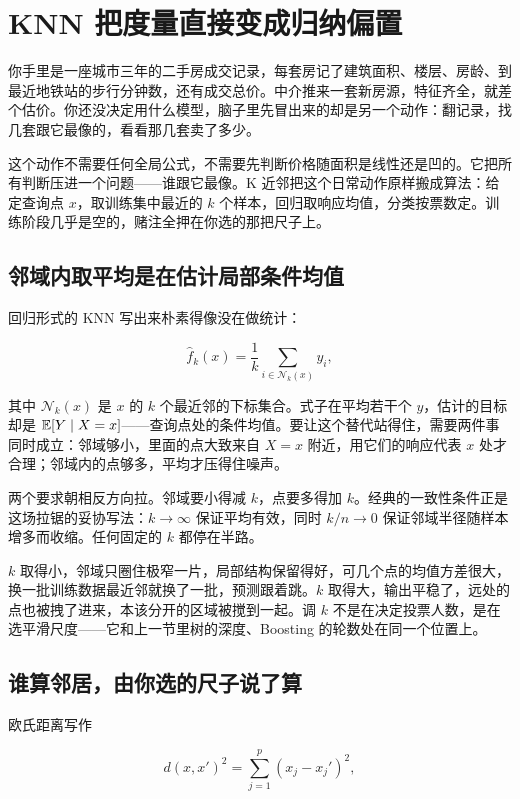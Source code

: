 \section{KNN 把度量直接变成归纳偏置}
\label{sec:13-Machine-Learning/03-Trees-Ensembles-and-Neighbors/03}

你手里是一座城市三年的二手房成交记录，每套房记了建筑面积、楼层、房龄、到最近地铁站的步行分钟数，还有成交总价。中介推来一套新房源，特征齐全，就差个估价。你还没决定用什么模型，脑子里先冒出来的却是另一个动作：翻记录，找几套跟它最像的，看看那几套卖了多少。

这个动作不需要任何全局公式，不需要先判断价格随面积是线性还是凹的。它把所有判断压进一个问题——谁跟它最像。K 近邻把这个日常动作原样搬成算法：给定查询点 \(x\)，取训练集中最近的 \(k\) 个样本，回归取响应均值，分类按票数定。训练阶段几乎是空的，赌注全押在你选的那把尺子上。

\subsection{邻域内取平均是在估计局部条件均值}

回归形式的 KNN 写出来朴素得像没在做统计：

\[
\widehat f_k(x)=\frac1k\sum_{i\in\mathcal N_k(x)}y_i ,
\]

其中 \(\mathcal N_k(x)\) 是 \(x\) 的 \(k\) 个最近邻的下标集合。式子在平均若干个 \(y\)，估计的目标却是 \(\mathbb{E}[Y\mid X=x]\)——查询点处的条件均值。要让这个替代站得住，需要两件事同时成立：邻域够小，里面的点大致来自 \(X=x\) 附近，用它们的响应代表 \(x\) 处才合理；邻域内的点够多，平均才压得住噪声。

两个要求朝相反方向拉。邻域要小得减 \(k\)，点要多得加 \(k\)。经典的一致性条件正是这场拉锯的妥协写法：\(k\to\infty\) 保证平均有效，同时 \(k/n\to0\) 保证邻域半径随样本增多而收缩。任何固定的 \(k\) 都停在半路。

\(k\) 取得小，邻域只圈住极窄一片，局部结构保留得好，可几个点的均值方差很大，换一批训练数据最近邻就换了一批，预测跟着跳。\(k\) 取得大，输出平稳了，远处的点也被拽了进来，本该分开的区域被搅到一起。调 \(k\) 不是在决定投票人数，是在选平滑尺度——它和上一节里树的深度、Boosting 的轮数处在同一个位置上。

\subsection{谁算邻居，由你选的尺子说了算}

欧氏距离写作

\[
d(x,x')^2=\sum_{j=1}^{p}(x_j-x_j')^2 ,
\]

